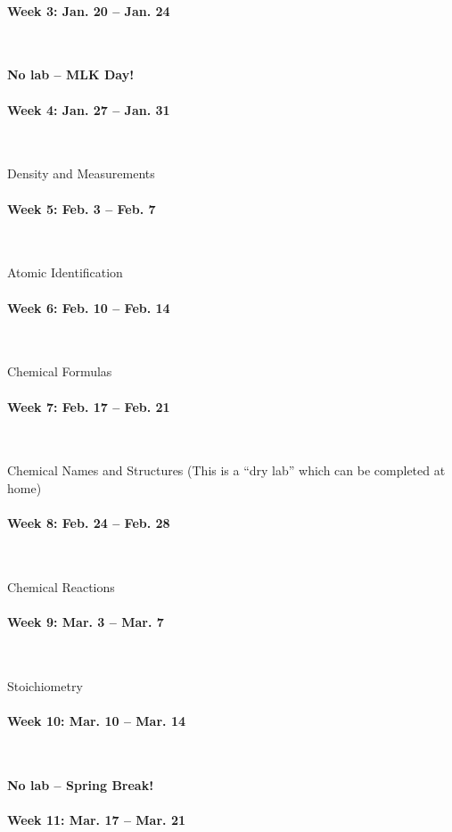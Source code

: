 \documentclass[12pt, letterpaper]{article}
\begin{document}
\paragraph{Week 3: Jan. 20 -- Jan. 24}~

\textbf{No lab -- MLK Day!}

\paragraph{Week 4: Jan. 27 -- Jan. 31}~

Density and Measurements

\paragraph{Week 5: Feb. 3 -- Feb. 7}~

Atomic Identification

\paragraph{Week 6: Feb. 10 -- Feb. 14}~

Chemical Formulas

\paragraph{Week 7: Feb. 17 -- Feb. 21}~

Chemical Names and Structures (This is a ``dry lab'' which can be completed at home)

\paragraph{Week 8: Feb. 24 -- Feb. 28}~

Chemical Reactions

\paragraph{Week 9: Mar. 3 -- Mar. 7}~

Stoichiometry

\paragraph{Week 10: Mar. 10 -- Mar. 14}~

\textbf{No lab -- Spring Break!}

\paragraph{Week 11: Mar. 17 -- Mar. 21}~
\end{document}
